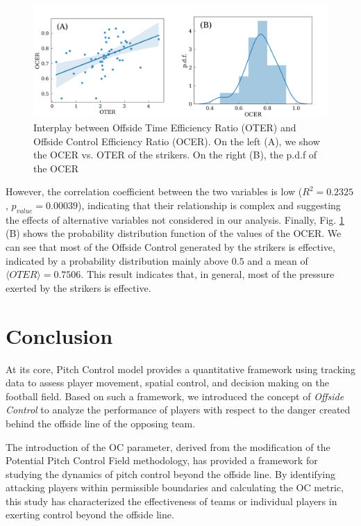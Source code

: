 \documentclass[
  10pt,
  twoside,nohyper]{book}
\begin{document}
\begin{figure}[H]

{\centering \includegraphics[width=0.8\linewidth,]{imagenes/av_eff} 

}

\caption{Interplay between Offside Time Efficiency Ratio (OTER) and Offside Control Efficiency Ratio (OCER). On the left (A), we show the OCER vs. OTER of the strikers. On the right (B), the p.d.f of the OCER}\label{fig:forwardsglob}
\end{figure}

However, the correlation coefficient between the two variables is low (\(R^2=0.2325\), \(p_{value} = 0.00039\)), indicating that their relationship is complex and suggesting the effects of alternative variables not considered in our analysis. Finally, Fig. \ref{fig:forwardsglob} (B) shows the probability distribution function of the values of the OCER. We can see that most of the Offside Control generated by the strikers is effective, indicated by a probability distribution mainly above \(0.5\) and a mean of \(\langle OTER \rangle=0.7506\). This result indicates that, in general, most of the pressure exerted by the strikers is effective.

\chapter{Conclusion}\label{conclusion}

At its core, Pitch Control model provides a quantitative framework using tracking data to assess player movement, spatial control, and decision making on the football field. Based on such a framework, we introduced the concept of \emph{Offside Control} to analyze the performance of players with respect to the danger created behind the offside line of the opposing team.

The introduction of the OC parameter, derived from the modification of the Potential Pitch Control Field methodology, has provided a framework for studying the dynamics of pitch control beyond the offside line. By identifying attacking players within permissible boundaries and calculating the OC metric, this study has characterized the effectiveness of teams or individual players in exerting control beyond the offside line.
\end{document}
